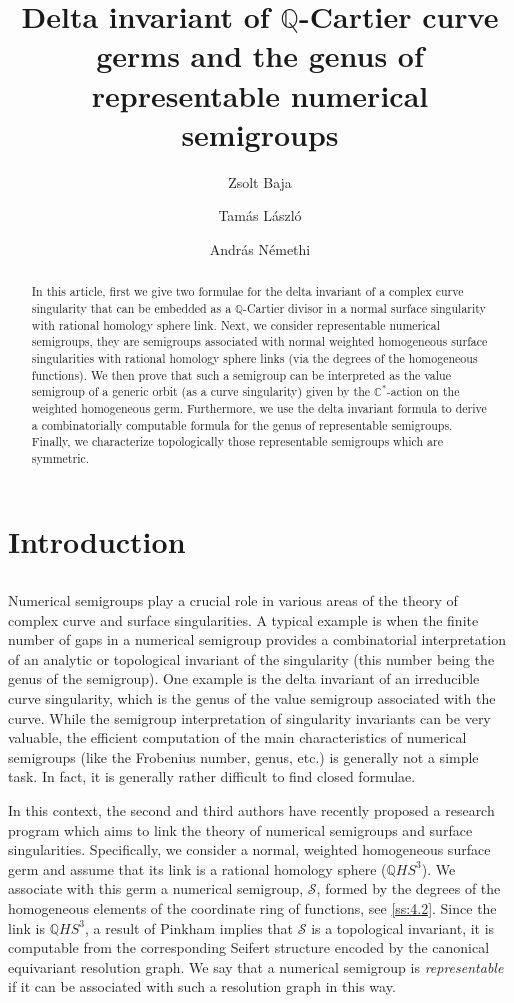 \documentclass[12pt,a4paper]{amsart}
\title[Delta invariant and genus of representable semigroups]
{Delta invariant of $\mathbb{Q}$-Cartier curve germs and the genus of representable numerical semigroups}
\author[Zs. Baja]{Zsolt Baja}
\author[T. L\'aszl\'o]{Tam\'as L\'aszl\'o}
\author[A. N\'emethi]{Andr\'as N\'emethi}
\theoremstyle{remark}
\theoremstyle{definition}
\begin{document}
\begin{abstract}
In this article, first we give two formulae for the delta invariant of a complex curve singularity that can be embedded as a ${\mathbb Q}$-Cartier divisor in a normal surface singularity with rational homology sphere link. Next, we consider representable numerical semigroups, they are semigroups associated with normal weighted homogeneous surface singularities with rational homology sphere links (via the degrees of the homogeneous functions). We then prove that such a  semigroup can be interpreted as the value semigroup of a generic orbit (as a curve singularity)  given by the $\mathbb{C}^*$-action on the weighted homogeneous germ. Furthermore, we use the delta invariant formula to derive a combinatorially computable formula for the genus of representable semigroups. Finally, we 
characterize topologically those  representable semigroups which are  symmetric.
\end{abstract}

\maketitle

\section{Introduction}
\subsection{}
Numerical semigroups play a crucial role in various areas of the theory of complex curve and surface singularities. A typical example is when the finite number of gaps in a numerical semigroup provides a combinatorial interpretation of an analytic or topological invariant of the singularity (this number being the genus of the semigroup). One example is the delta invariant of an irreducible curve singularity, which is the genus of the value semigroup associated with the curve. 
While the semigroup interpretation of singularity invariants can be very valuable, the efficient computation of the main  characteristics of numerical semigroups  (like the 
Frobenius number, genus, etc.) is generally not a simple task. 
 In fact, it is generally rather difficult to find closed formulae.

In this context, the second and third authors \cite{stronglyflat} have recently proposed a 
research program which aims to link the theory of numerical semigroups and  surface singularities. 
Specifically, we consider a normal, weighted homogeneous surface germ and assume that its link is a rational homology sphere ($\mathbb{Q}HS^3$). We associate with this germ a numerical semigroup, $\mathcal{S}$, 
formed by the degrees of  the homogeneous elements  of the coordinate ring of functions, see \ref{ss:4.2}. Since the link is $\mathbb{Q}HS^3$, a result of Pinkham \cite{pinkham} implies that $\mathcal{S}$ is a topological invariant, it is computable from  the corresponding Seifert structure encoded by the canonical equivariant resolution graph. 
We say that a numerical semigroup is {\it representable}
if it can be associated with such a resolution graph in this way.
\end{document}
